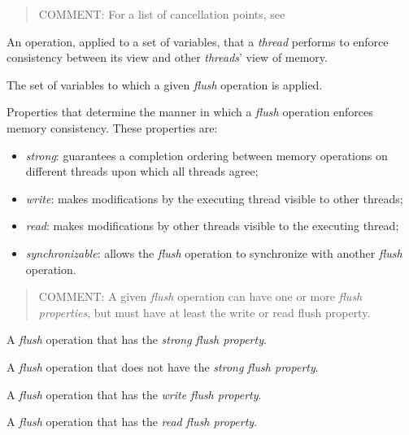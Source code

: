 \begin{quote}
COMMENT: For a list of cancellation points, see 
\end{quote}
\glossarydefend
\bigskip

\glossarydefstart
An operation, applied to a set of variables, that a \emph{thread} performs
to enforce consistency between its view and other \emph{threads}' view of
memory.
\glossarydefend

\glossarydefstart
The set of variables to which a given \emph{flush} operation is applied.
\glossarydefend

\glossarydefstart
Properties that determine the manner in which a \emph{flush} operation enforces
memory consistency. These properties are:
\begin{itemize}
    \item \emph{strong}:  guarantees a completion ordering between memory operations
        on different threads upon which all threads agree;
    \item \emph{write}: makes modifications by the executing thread visible
        to other threads;
    \item \emph{read}: makes modifications by other threads visible to the
        executing thread;
    \item \emph{synchronizable}: allows the \emph{flush} operation to
        synchronize with another \emph{flush} operation.
\end{itemize}

\begin{quote}
COMMENT: A given \emph{flush} operation can have one or more \emph{flush
properties}, but must have at least the write or read flush property.
\end{quote}
\glossarydefend

\glossarydefstart
A \emph{flush} operation that has the \emph{strong flush property}.
\glossarydefend

\glossarydefstart
A \emph{flush} operation that does not have the \emph{strong flush property}.
\glossarydefend

\glossarydefstart
A \emph{flush} operation that has the \emph{write flush property}.
\glossarydefend

\glossarydefstart
A \emph{flush} operation that has the \emph{read flush property}.
\glossarydefend

